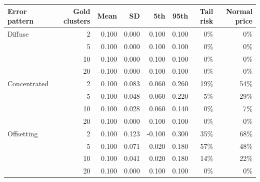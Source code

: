 \begin{tabular}{lrrrrrrr}
\toprule
Error pattern & Gold clusters & Mean & SD & 5th & 95th & Tail risk & Normal price \\
\midrule
Diffuse & 2 & 0.100 & 0.000 & 0.100 & 0.100 & 0\% & 0\% \\
 & 5 & 0.100 & 0.000 & 0.100 & 0.100 & 0\% & 0\% \\
 & 10 & 0.100 & 0.000 & 0.100 & 0.100 & 0\% & 0\% \\
 & 20 & 0.100 & 0.000 & 0.100 & 0.100 & 0\% & 0\% \\
\addlinespace
Concentrated & 2 & 0.100 & 0.083 & 0.060 & 0.260 & 19\% & 54\% \\
 & 5 & 0.100 & 0.048 & 0.060 & 0.220 & 5\% & 29\% \\
 & 10 & 0.100 & 0.028 & 0.060 & 0.140 & 0\% & 7\% \\
 & 20 & 0.100 & 0.000 & 0.100 & 0.100 & 0\% & 0\% \\
\addlinespace
Offsetting & 2 & 0.100 & 0.123 & -0.100 & 0.300 & 35\% & 68\% \\
 & 5 & 0.100 & 0.071 & 0.020 & 0.180 & 57\% & 48\% \\
 & 10 & 0.100 & 0.041 & 0.020 & 0.180 & 14\% & 22\% \\
 & 20 & 0.100 & 0.000 & 0.100 & 0.100 & 0\% & 0\% \\
\bottomrule
\end{tabular}
